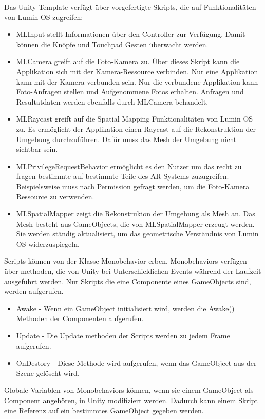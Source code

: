 Das Unity Template verfügt über vorgefertigte Skripts, die auf Funktionalitäten von Lumin OS zugreifen:

\begin{itemize}
	\item MLInput stellt Informationen über den Controller zur Verfügung. Damit können die Knöpfe und Touchpad Gesten überwacht werden.
	\item MLCamera greift auf die Foto-Kamera zu. Über dieses Skript kann die Applikation sich mit der Kamera-Ressource verbinden. Nur eine Applikation kann mit der Kamera verbunden sein. Nur die verbundene Applikation kann Foto-Anfragen stellen und Aufgenommene Fotos erhalten. Anfragen und Resultatdaten werden ebenfalls durch MLCamera behandelt.
	\item MLRaycast greift auf die Spatial Mapping Funktionalitäten von Lumin OS zu. Es ermöglicht der Applikation einen Raycast auf die Rekonstruktion der Umgebung durchzuführen. Dafür muss das Mesh der Umgebung nicht sichtbar sein.
	\item MLPrivilegeRequestBehavior ermöglicht es den Nutzer um das recht zu fragen bestimmte auf bestimmte Teile des AR Systems zuzugreifen. Beispielsweise muss nach Permission gefragt werden, um die Foto-Kamera Ressource zu verwenden. 
	\item MLSpatialMapper zeigt die Rekonstrukion der Umgebung als Mesh an. Das Mesh besteht aus GameObjects, die von MLSpatialMapper erzeugt werden. Sie werden ständig aktualisiert, um das geometrische Verständnis von Lumin OS widerzuspiegeln.
\end{itemize}

Scripts können von der Klasse Monobehavior erben. Monobehaviors verfügen über methoden, die von Unity bei Unterschieldichen Events während der Laufzeit ausgeführt werden. Nur Skripts die eine Componente eines GameObjects sind, werden aufgerufen.

\begin{itemize}
	\item Awake - Wenn ein GameObject initialisiert wird, werden die Awake() Methoden der Componenten aufgerufen.
	\item Update - Die Update methoden der Scripts werden zu jedem Frame aufgerufen.
	\item OnDestory - Diese Methode wird aufgerufen, wenn das GameObject aus der Szene gelöscht wird.
\end{itemize}

Globale Variablen von Monobehaviors können, wenn sie einem GameObject als Component angehören, in Unity modifiziert werden. Dadurch kann einem Skript eine Referenz auf ein bestimmtes GameObject gegeben werden.

